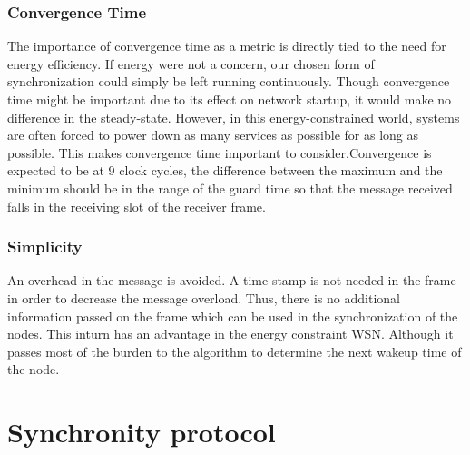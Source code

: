 \documentclass[a4paper,8pt]{report}
\begin{document}
\subsection{Convergence Time}
The importance of convergence time as a metric is directly tied to
the need for energy efficiency. If energy were not a concern, our
chosen form of synchronization could simply be left running
continuously. Though convergence time might be important due to its
effect on network startup, it would make no difference in the
steady-state. However, in this energy-constrained world, systems are
often forced to power down as many services as possible for as long
as possible. This makes convergence time important to
consider.\newline Convergence is expected to be at 9 clock cycles,
the difference between the maximum and the minimum should be in the
range of the guard time so that the message received falls in the
receiving slot of the receiver frame.
\subsection{Simplicity}
An overhead in the message is avoided. A time stamp is not needed in
the frame in order to decrease the message overload. Thus, there is
no additional information passed on the frame which can be used in
the synchronization of the nodes. This inturn has an advantage in
the energy constraint WSN. Although it passes most of the burden to
the algorithm to determine the next wakeup time of the node.
\newpage
\chapter{Synchronity protocol}
\end{document}
